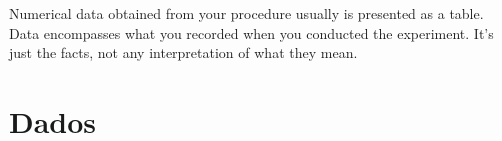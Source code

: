 

Numerical data obtained from your procedure usually is presented as a table. Data encompasses what you recorded when you conducted the experiment. It's just the facts, not any interpretation of what they mean.


\section{Dados}
\label{dados}




  